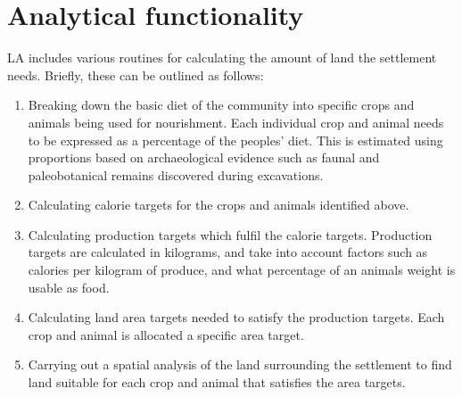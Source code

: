 \section{Analytical functionality} \label{sec:Analytical Functionality}
  LA includes various routines for calculating the amount of land 
  the settlement needs.  Briefly, these can be outlined as follows:
  \begin{enumerate} 
    \item Breaking down the basic diet of the community into specific crops and
      animals being used for nourishment.  Each individual crop and animal needs to
      be expressed as a percentage of the peoples' diet.  This is estimated using
      proportions based on archaeological evidence such as faunal and
      paleobotanical remains discovered during excavations.  
    \item Calculating calorie targets for the crops and animals identified above.
    \item Calculating production targets which fulfil the calorie targets.
      Production targets are calculated in kilograms, and take into account factors
      such as calories per kilogram of produce, and what percentage of an animals
      weight is usable as food.  
    \item Calculating land area targets needed to satisfy the production targets.
      Each crop and animal is allocated a specific area target.  
    \item Carrying out a spatial analysis of the land surrounding the settlement
      to find land suitable for each crop and animal that satisfies the area
      targets.
  \end{enumerate}
